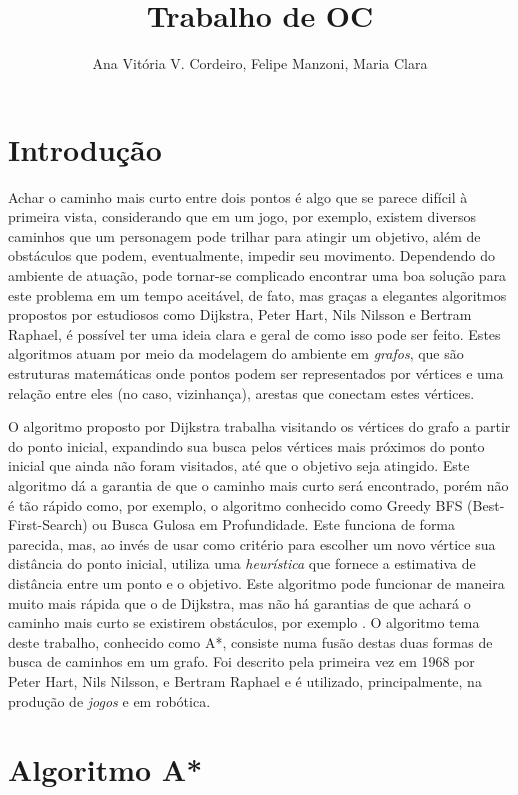 \documentclass[12pt]{article}
\title{Trabalho de OC}
\author{Ana Vitória V. Cordeiro, Felipe Manzoni, Maria Clara}
\begin{document}
 

\maketitle

\section{Introdução}

Achar o caminho mais curto entre dois pontos é algo que se parece difícil à primeira vista, considerando que em um jogo, por exemplo, existem diversos caminhos que um personagem pode trilhar para atingir um objetivo, além de obstáculos que podem, eventualmente, impedir seu movimento. Dependendo do ambiente de atuação, pode tornar-se complicado encontrar uma boa solução para este problema em um tempo aceitável, de fato, mas graças a elegantes algoritmos propostos por estudiosos como Dijkstra, Peter Hart, Nils Nilsson e Bertram Raphael, é possível ter uma ideia clara e geral de como isso pode ser feito. Estes algoritmos atuam por meio da modelagem do ambiente em \emph{grafos}, que são estruturas matemáticas onde pontos podem ser representados por vértices e uma relação entre eles (no caso, vizinhança), arestas que conectam estes vértices.

O algoritmo proposto por Dijkstra trabalha visitando os vértices do grafo a partir do ponto inicial, expandindo sua busca pelos vértices mais próximos do ponto inicial que ainda não foram visitados, até que o objetivo seja atingido. Este algoritmo dá a garantia de que o caminho mais curto será encontrado, porém não é tão rápido como, por exemplo, o algoritmo conhecido como Greedy BFS (Best-First-Search) ou Busca Gulosa em Profundidade. Este funciona de forma parecida, mas, ao invés de usar como critério para escolher um novo vértice sua distância do ponto inicial, utiliza uma \emph{heurística} que fornece a estimativa de distância entre um ponto e o objetivo. Este algoritmo pode funcionar de maneira muito mais rápida que o de Dijkstra, mas não há garantias de que achará o caminho mais curto se existirem obstáculos, por exemplo \cite{amit:2014}. O algoritmo tema deste trabalho, conhecido como A*, consiste numa fusão destas duas formas de busca de caminhos em um grafo. Foi descrito pela primeira vez em 1968 por Peter Hart, Nils Nilsson, e Bertram Raphael e é utilizado, principalmente, na produção de \emph{jogos} e em robótica.

\section{Algoritmo A*} \label{sec:dado}
\end{document}
